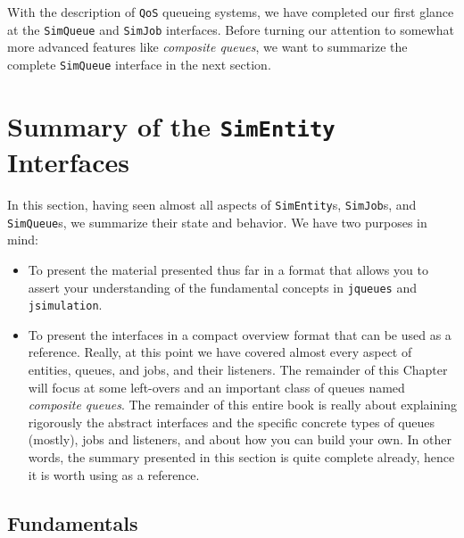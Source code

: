 \documentclass[12pt]{book}
\begin{document}
With the description of \lstinline|QoS| queueing systems,
  we have completed our first glance at the \lstinline|SimQueue|
  and \lstinline|SimJob| interfaces.
Before turning our attention to somewhat more advanced features like
  {\em composite queues},
  we want to summarize the complete \lstinline|SimQueue| interface in the next section.

\section{Summary of the \texttt{SimEntity} Interfaces}
\label{sec:guided:simentity-model}

In this section,
  having seen almost all aspects of \lstinline|SimEntity|s,
  \lstinline|SimJob|s,
  and \lstinline|SimQueue|s,
  we summarize their state and behavior.
We have two purposes in mind:
\begin{itemize}
  \item To present the material presented thus far in a format
          that allows you to assert your understanding
          of the fundamental concepts in \lstinline|jqueues|
          and \lstinline|jsimulation|.
  \item To present the interfaces in a compact overview format
          that can be used as a reference.
        Really, at this point we have covered almost every aspect
          of entities, queues, and jobs, and their listeners.
        The remainder of this Chapter will focus at some
          left-overs and an important class of queues
          named {\em composite queues}.
        The remainder of this entire book is really
          about explaining rigorously the abstract interfaces
          and the specific concrete types
          of queues (mostly), jobs and listeners,
          and about how you can build your own.
        In other words, the summary presented in this section
          is quite complete already,
          hence it is worth using as a reference.
\end{itemize}

\subsection{Fundamentals}
\end{document}
